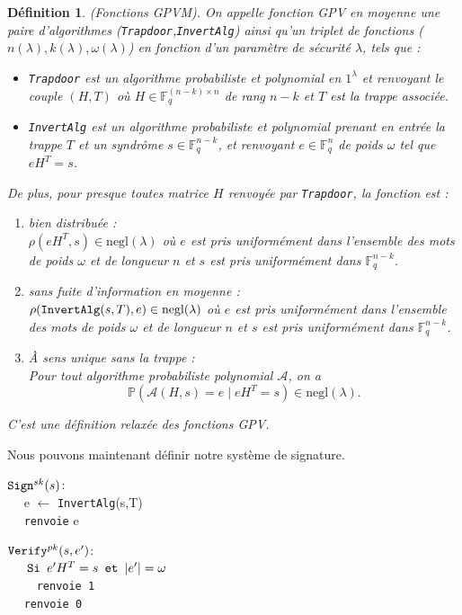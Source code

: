 \documentclass[12pt]{article}
\theoremstyle{plain}
\newtheorem{defi}[thm]{Définition}
\newcommand{\F}{\mathbb{F}}
\begin{document}
\begin{defi} (Fonctions GPVM). On appelle fonction GPV en moyenne une paire d'algorithmes (\verb|Trapdoor|,\verb|InvertAlg|) ainsi qu'un triplet de fonctions ($n(\lambda),k(\lambda),\omega(\lambda)$) en fonction d'un paramètre de sécurité $\lambda$, tels que :
\begin{itemize}
\item \verb|Trapdoor| est un algorithme probabiliste et polynomial en $1^\lambda$ et renvoyant le couple $(H,T)$ où $H \in \F_q^{(n-k) \times n}$ de rang $n-k$ et $T$ est la trappe associée.
\item \verb|InvertAlg| est un algorithme probabiliste et polynomial prenant en entrée la trappe $T$ et un syndrôme $s \in \F_q^{n-k}$, et renvoyant $e \in \F_q^{n}$ de poids $\omega$ tel que $eH^T = s$.
\end{itemize}
De plus, pour \textit{presque toutes} matrice $H$ renvoyée par \verb|Trapdoor|, la fonction est :
\begin{enumerate}
\item bien distribuée : \\
$\rho(eH^T,s) \in \text{negl}(\lambda)$ où $e$ est pris uniformément dans l'ensemble des mots de poids $\omega$ et de longueur $n$ et $s$ est pris uniformément dans $\F_q^{n-k}$. 
\item sans fuite d'information \textit{en moyenne} : \\
$ \rho(\verb|InvertAlg|(s,T),e) \in \text{negl}(\lambda)$ où $e$ est pris uniformément dans l'ensemble des mots de poids $\omega$ et de longueur $n$ et $s$ est pris uniformément dans $\F_q^{n-k}$. 
\item \`A sens unique sans la trappe : \\
Pour tout algorithme probabiliste polynomial $\mathcal{A}$, on a 
$$\mathbb{P}(\mathcal{A}(H,s) = e \;| \;eH^T = s) \in \text{negl}(\lambda).$$
\end{enumerate}
C'est une définition relaxée des fonctions GPV.
\end{defi}

Nous pouvons maintenant définir notre système de signature.
\begin{multicols}{2}
\begin{flushleft}
$\verb|Sign|^{sk}(s)$:\\
	$\quad$ e $\leftarrow$  \verb|InvertAlg|(s,T) \\
	$\quad$ \verb|renvoie| e
\end{flushleft}
\begin{flushleft}
$\verb|Verify|^{pk}(s,e')$: \\
	$\quad \verb| Si | e'H^T = s \verb| et | |e'| = \omega $ \\
	$\quad \quad$ \verb|renvoie 1| \\
	$\quad$ \verb|renvoie 0|
\end{flushleft}
\end{multicols}
\end{document}
